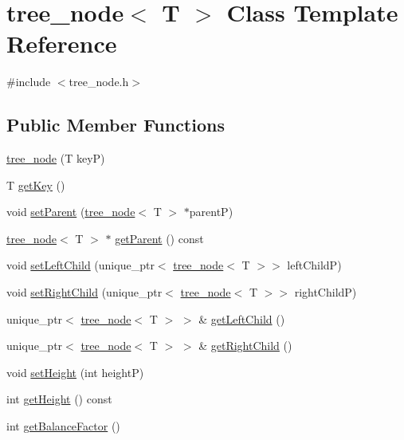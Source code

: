 \hypertarget{classtree__node}{}\section{tree\+\_\+node$<$ T $>$ Class Template Reference}
\label{classtree__node}


{\ttfamily \#include $<$tree\+\_\+node.\+h$>$}

\subsection*{Public Member Functions}
\begin{DoxyCompactItemize}
\item 
\hyperlink{classtree__node_a776da4de6a1faef8b984f8b6dfe6eb6a}{tree\+\_\+node} (T keyP)
\item 
T \hyperlink{classtree__node_afbe2d91ad009570338290ed9eb8a7485}{get\+Key} ()
\item 
void \hyperlink{classtree__node_a1fe75baae3a5d9caa9cb886c54c291e2}{set\+Parent} (\hyperlink{classtree__node}{tree\+\_\+node}$<$ T $>$ $\ast$parentP)
\item 
\hyperlink{classtree__node}{tree\+\_\+node}$<$ T $>$ $\ast$ \hyperlink{classtree__node_aa17e609b57f77bb5446d83c964409ac4}{get\+Parent} () const
\item 
void \hyperlink{classtree__node_a3db979969a0fe8505ba65c7afabb5463}{set\+Left\+Child} (unique\+\_\+ptr$<$ \hyperlink{classtree__node}{tree\+\_\+node}$<$ T $>$$>$ left\+ChildP)
\item 
void \hyperlink{classtree__node_afea4c6595dafba65b5c4e59ca3da30f3}{set\+Right\+Child} (unique\+\_\+ptr$<$ \hyperlink{classtree__node}{tree\+\_\+node}$<$ T $>$$>$ right\+ChildP)
\item 
unique\+\_\+ptr$<$ \hyperlink{classtree__node}{tree\+\_\+node}$<$ T $>$ $>$ \& \hyperlink{classtree__node_ae161b70a3780e0cb3ecd4b57acc9e2d1}{get\+Left\+Child} ()
\item 
unique\+\_\+ptr$<$ \hyperlink{classtree__node}{tree\+\_\+node}$<$ T $>$ $>$ \& \hyperlink{classtree__node_a5e584d47f2c11941fe0406836fe50159}{get\+Right\+Child} ()
\item 
void \hyperlink{classtree__node_a159ebd6d96c0e2111eb0ef6a36d50471}{set\+Height} (int heightP)
\item 
int \hyperlink{classtree__node_a57c8b2000ad0a13b67532b81ba73720b}{get\+Height} () const
\item 
int \hyperlink{classtree__node_ab69072fe36a848328440efcf5362bca1}{get\+Balance\+Factor} ()

\end{DoxyCompactItemize}
